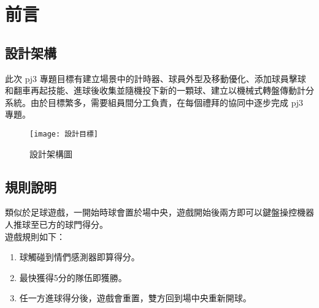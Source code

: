 \chapter{前言}
\renewcommand{\baselinestretch}{10.0} %
\setcounter{page}{1}  %
\fontsize{14pt}{2.5pt}\sectionef
\section{設計架構}
此次 pj3 專題目標有建立場景中的計時器、球員外型及移動優化、添加球員擊球和翻車再起技能、進球後收集並隨機投下新的一顆球、建立以機械式轉盤傳動計分系統。由於目標繁多，需要組員間分工負責，在每個禮拜的協同中逐步完成 pj3 專題。\\

\begin{figure}[hbt!]
\begin{center}
\texttt{[image: 設計目標]}
\caption{\Large 設計架構圖}\label{fig.設計目標}
\end{center}
\end{figure}

\section{規則說明}
類似於足球遊戲，一開始時球會置於場中央，遊戲開始後兩方即可以鍵盤操控機器人推球至已方的球門得分。\\
遊戲規則如下：
\begin{enumerate}
\item 球觸碰到情們感測器即算得分。
\item 最快獲得5分的隊伍即獲勝。
\item 任一方進球得分後，遊戲會重置，雙方回到場中央重新開球。
\end{enumerate}

\renewcommand{\baselinestretch}{0.5} %